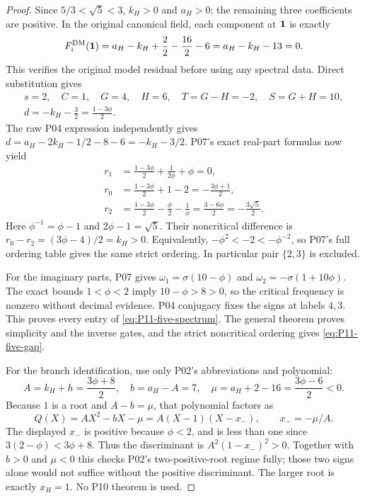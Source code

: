 \begin{proof}
Since $5/3<\sqrt5<3$, $k_H>0$ and $a_H>0$;
the remaining three coefficients are positive. In the original
canonical field, each component at $\mathbf{1}$ is exactly
\[
 F_i^{\mathrm{DM}}(\mathbf{1})=a_H-k_H+\frac22-\frac{16}2-6
     =a_H-k_H-13=0.
\]
This verifies the original model residual before using any spectral data.
Direct substitution gives
\begin{equation}
 \begin{gathered}
 s=2,\quad C=1,\quad G=4,\quad H=6,\quad T=G-H=-2,\quad S=G+H=10,\\
 d=-k_H-\frac32=\frac{1-3\phi}{2}.
 \end{gathered}
 \label{eq:P11-five-effective}
\end{equation}
The raw P04 expression independently gives
$d=a_H-2k_H-1/2-8-6=-k_H-3/2$.
P07's exact real-part formulas now yield
\begin{align*}
 r_1&=\frac{1-3\phi}{2}+\frac{1}{2\phi}+\phi=0,\\
 r_0&=\frac{1-3\phi}{2}+1-2=-\frac{3\phi+1}{2},\\
 r_2&=\frac{1-3\phi}{2}-\frac\phi2-\frac1\phi
       =\frac{3-6\phi}{2}=-\frac{3\sqrt5}{2}.
\end{align*}
Here $\phi^{-1}=\phi-1$ and $2\phi-1=\sqrt5$.
Their noncritical difference is
$r_0-r_2=(3\phi-4)/2=k_H>0$. Equivalently,
$-\phi^2<-2<-\phi^{-2}$, so P07's full ordering table gives
the same strict ordering. In particular pair $\{2,3\}$ is excluded.

For the imaginary parts, P07 gives
$\omega_1=\sigma(10-\phi)$ and
$\omega_2=-\sigma(1+10\phi)$. The exact bounds $1<\phi<2$
imply $10-\phi>8>0$, so the critical frequency is nonzero without
decimal evidence. P04 conjugacy fixes the signs at labels $4,3$.
This proves every entry of \eqref{eq:P11-five-spectrum}.
The general theorem proves simplicity and the inverse gates, and the
strict noncritical ordering gives \eqref{eq:P11-five-gap}.

For the branch identification, use only P02's abbreviations and polynomial:
\begin{equation}
 A=k_H+h=\frac{3\phi+8}{2},\quad b=a_H-A=7,\quad
 \mu=a_H+2-16=\frac{3\phi-6}{2}<0.
 \label{eq:P11-branch-data}
\end{equation}
Because $1$ is a root and $A-b=\mu$, that polynomial factors as
\[
 Q(X)=AX^2-bX-\mu=A(X-1)(X-x_-),\qquad x_-=-\mu/A.
\]
The displayed $x_-$ is positive because $\phi<2$, and is less than
one since $3(2-\phi)<3\phi+8$. Thus the discriminant is
$A^2(1-x_-)^2>0$. Together with $b>0$ and $\mu<0$ this checks
P02's two-positive-root regime fully; those two signs alone would
not suffice without the positive discriminant. The larger root is
exactly $x_H=1$. No P10 theorem is used.
\end{proof}


